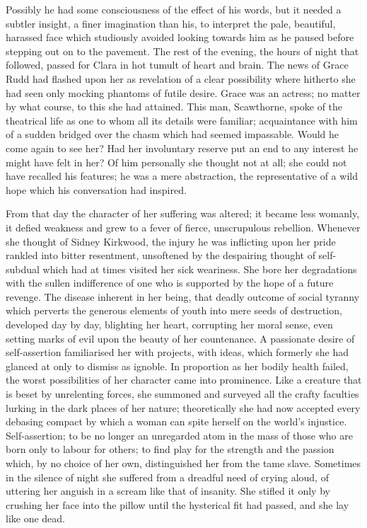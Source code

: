 Possibly he had some consciousness of the effect of his words, but it
needed a subtler insight, a finer imagination than his, to interpret the
pale, beautiful, harassed face which studiously avoided looking towards
him as he paused before stepping out on to the pavement. The rest of the
evening, the hours of night that followed, passed for Clara in hot
tumult of heart and brain. The news of Grace Rudd had flashed upon her
as revelation of a clear possibility where hitherto she had seen only
mocking phantoms of futile desire. Grace was an actress; no matter by
what course, to this she had attained. This man, Scawthorne, spoke of
the theatrical life as one to whom all its details were familiar;
acquaintance with him of a sudden bridged over the
{\protect\hypertarget{208}{}{}}chasm which had seemed impassable. Would
he come again to see her? Had her involuntary reserve put an end to any
interest he might have felt in her? Of him personally she thought not at
all; she could not have recalled his features; he was a mere
abstraction, the representative of a wild hope which his conversation
had inspired.

From that day the character of her suffering was altered; it became less
womanly, it defied weakness and grew to a fever of fierce, unscrupulous
rebellion. Whenever she thought of Sidney Kirkwood, the injury he was
inflicting upon her pride rankled into bitter resentment, unsoftened by
the despairing thought of self- subdual which had at times visited her
sick weariness. She bore her degradations with the sullen indifference
of one who is supported by the hope of a future revenge. The disease
inherent in her being, that deadly outcome of social tyranny which
perverts the generous elements of youth into mere seeds of destruction,
developed day by day, blighting her heart, corrupting her moral sense,
even {\protect\hypertarget{209}{}{}}setting marks of evil upon the
beauty of her countenance. A passionate desire of self-assertion
familiarised her with projects, with ideas, which formerly she had
glanced at only to dismiss as ignoble. In proportion as her bodily
health failed, the worst possibilities of her character came into
prominence. Like a creature that is beset by unrelenting forces, she
summoned and surveyed all the crafty faculties lurking in the dark
places of her nature; theoretically she had now accepted every debasing
compact by which a woman can spite herself on the world's injustice.
Self-assertion; to be no longer an unregarded atom in the mass of those
who are born only to labour for others; to find play for the strength
and the passion which, by no choice of her own, distinguished her from
the tame slave. Sometimes in the silence of night she suffered from a
dreadful need of crying aloud, of uttering her anguish in a scream like
that of insanity. She stifled it only by crushing her face into the
pillow until the hysterical fit had passed, and she lay like one dead.

